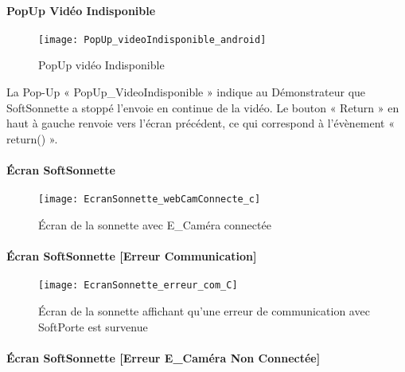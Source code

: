 \newpage

\paragraph{PopUp Vidéo Indisponible}
\hypertarget{popUpVideoIndisponible}{}

\begin{figure} [H]
    \centering
    \texttt{[image: PopUp\_videoIndisponible\_android]}
    \caption{PopUp vidéo Indisponible}
    \label{PopUp vidéo Indisponible}
\end{figure}

La Pop-Up « PopUp\_VideoIndisponible » indique au Démonstrateur que SoftSonnette a stoppé l'envoie en continue de la vidéo.
Le bouton « Return » en haut à gauche renvoie vers l’écran précédent, ce qui correspond à l'évènement « return() ». 

\newpage

\paragraph{Écran SoftSonnette}
\hypertarget{EcranWebcamConnec}{}

\begin{figure} [H]
    \centering
    \texttt{[image: EcranSonnette\_webCamConnecte\_c]}
    \caption{Écran de la sonnette avec E\_Caméra connectée}
    \label{Écran de la sonnette webCam connectée}
\end{figure}

\paragraph{Écran SoftSonnette [Erreur Communication]}
\hypertarget{EcranErreurCommunication}{}

\begin{figure} [H]
    \centering
    \texttt{[image: EcranSonnette\_erreur\_com\_C]}
    \caption{Écran de la sonnette affichant qu'une erreur de communication avec SoftPorte est survenue}
    \label{Écran de la sonnette affichant qu'une erreur de communication avec SoftPorte est survenue}
\end{figure}

\paragraph{Écran SoftSonnette [Erreur E\_Caméra Non Connectée]}
\hypertarget{EcranWebcamNonConnec}{}

